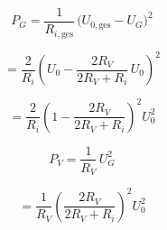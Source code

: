 {\begin {enumerate}[label=\alph*)]
            \[
P_G
= \frac{1}{R_{i,\mathrm{ges}}}\,\bigl(U_{0,\mathrm{ges}} - U_G\bigr)^2
\]

\[
= \frac{2}{R_i}
\left(
U_0 - \frac{2 R_V}{2 R_V + R_i}\, U_0
\right)^2
\]

\[
= \frac{2}{R_i}
\left(
1 - \frac{2 R_V}{2 R_V + R_i}
\right)^2
U_0^2
\]

\medskip

\[
P_V
= \frac{1}{R_V}\, U_G^2
\]

\[
= \frac{1}{R_V}
\left(
\frac{2 R_V}{2 R_V + R_i}
\right)^2
U_0^2
\]
    \end{enumerate}

}